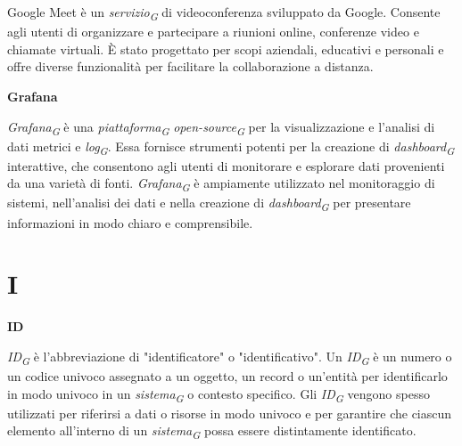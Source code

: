 \documentclass{article}
\begin{document}
Google Meet è un \textit{servizio}\textsubscript{\textit{G}} di videoconferenza sviluppato da Google. Consente agli utenti di organizzare e partecipare a riunioni online, conferenze video e chiamate virtuali. È stato progettato per scopi aziendali, educativi e personali e offre diverse funzionalità per facilitare la collaborazione a distanza. 

\vspace{0.4cm}

\textbf{Grafana}

\vspace{0.1cm}

\textit{Grafana}\textsubscript{\textit{G}} è una \textit{piattaforma}\textsubscript{\textit{G}} \textit{open-source}\textsubscript{\textit{G}} per la visualizzazione e l'analisi di dati metrici e \textit{log}\textsubscript{\textit{G}}. Essa fornisce strumenti potenti per la creazione di \textit{dashboard}\textsubscript{\textit{G}} interattive, che consentono agli utenti di monitorare e esplorare dati provenienti da una varietà di fonti. \textit{Grafana}\textsubscript{\textit{G}} è ampiamente utilizzato nel monitoraggio di sistemi, nell'analisi dei dati e nella creazione di \textit{dashboard}\textsubscript{\textit{G}} per presentare informazioni in modo chiaro e comprensibile.

\pagebreak
\section*{I}
{}

\vspace{0.4cm}

\textbf{ID}

\vspace{0.1cm}

\textit{ID}\textsubscript{\textit{G}} è l'abbreviazione di "identificatore" o "identificativo". Un \textit{ID}\textsubscript{\textit{G}} è un numero o un codice univoco assegnato a un oggetto, un record o un'entità per identificarlo in modo univoco in un \textit{sistema}\textsubscript{\textit{G}} o contesto specifico. Gli \textit{ID}\textsubscript{\textit{G}} vengono spesso utilizzati per riferirsi a dati o risorse in modo univoco e per garantire che ciascun elemento all'interno di un \textit{sistema}\textsubscript{\textit{G}} possa essere distintamente identificato.

\vspace{0.4cm}
\end{document}
